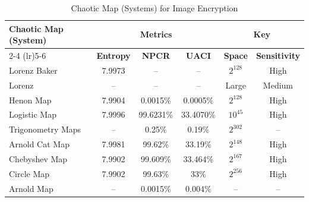\documentclass[a4paper, 12pt]{book} %
\begin{document}
\begin{table}[ht]
\centering
\caption{Chaotic Map (Systems) for Image Encryption}
\label{tab:chaotic_maps}
\begin{tabular}{lccccc}
\toprule
\multirow{2}{*}{\textbf{Chaotic Map (System)}} &
\multicolumn{3}{c}{\textbf{Metrics}} &
\multicolumn{2}{c}{\textbf{Key}} \\
\cmidrule(lr){2-4}
\cmidrule(lr){5-6}
 & \textbf{Entropy} & \textbf{NPCR} & \textbf{UACI} &
\textbf{Space} & \textbf{Sensitivity} \\
\midrule
Lorenz Baker      & 7.9973 & --        & --        & $2^{128}$ & High   \\
Lorenz            & --     & --        & --        & Large     & Medium \\
Henon Map         & 7.9904 & 0.0015\%  & 0.0005\%  & $2^{128}$ & High   \\
Logistic Map      & 7.9996 & 99.6231\% & 33.4070\% & $10^{45}$ & High   \\
Trigonometry Maps & --     & 0.25\%    & 0.19\%    & $2^{302}$ & --     \\
Arnold Cat Map    & 7.9981 & 99.62\%   & 33.19\%   & $2^{148}$ & High   \\
Chebyshev Map     & 7.9902 & 99.609\%  & 33.464\%  & $2^{167}$ & High   \\
Circle Map        & 7.9902 & 99.63\%   & 33\%      & $2^{256}$ & High   \\
Arnold Map        & --     & 0.0015\%  & 0.004\%   & --        & --     \\
\bottomrule
\end{tabular}
\end{table}






\end{document}
